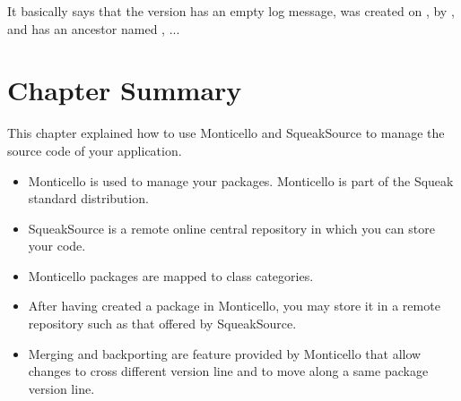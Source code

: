 \documentclass[a4paper,10pt,twoside]{book}
\begin{document}

It basically says that the version  has an empty log message, was created on , by , and has an ancestor named , ...





\section{Chapter Summary}

This chapter explained how to use Monticello and SqueakSource to manage the source code of your application.

\begin{itemize}
\item Monticello is used to manage your packages. Monticello is part of the Squeak standard distribution.

\item SqueakSource is a remote online central repository in which you can store your code.

\item Monticello packages are mapped to class categories. 

\item After having created a package in Monticello, you may store it in a remote repository such as that offered by SqueakSource.

\item Merging and backporting are feature provided by Monticello that allow changes to cross different version line and to move along a same package version line.

\end{itemize}
\end{document}
